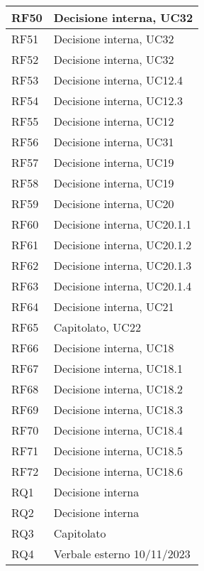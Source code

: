 \begin{center}
\begin{longtable}{|C{5cm}|C{5cm}|}
        \hline
        RF50 & Decisione interna, UC32 \\
        \hline
        RF51 & Decisione interna, UC32 \\
        \hline
        RF52 & Decisione interna, UC32 \\
        \hline
        RF53 & Decisione interna, UC12.4 \\
        \hline
        RF54 & Decisione interna, UC12.3 \\
        \hline
        RF55 & Decisione interna, UC12 \\
        \hline
        RF56 & Decisione interna, UC31 \\
        \hline
        RF57 & Decisione interna, UC19 \\
        \hline
        RF58 & Decisione interna, UC19 \\
        \hline
        RF59 & Decisione interna, UC20 \\
        \hline
        RF60 & Decisione interna, UC20.1.1 \\
        \hline
        RF61 & Decisione interna, UC20.1.2 \\
        \hline
        RF62 & Decisione interna, UC20.1.3 \\
        \hline
        RF63 & Decisione interna, UC20.1.4 \\
        \hline
        RF64 & Decisione interna, UC21 \\
        \hline
        RF65 & Capitolato, UC22 \\
        \hline
        RF66 & Decisione interna, UC18 \\
        \hline
        RF67 & Decisione interna, UC18.1 \\
        \hline
        RF68 & Decisione interna, UC18.2 \\
        \hline
        RF69 & Decisione interna, UC18.3 \\
        \hline
        RF70 & Decisione interna, UC18.4 \\
        \hline
        RF71 & Decisione interna, UC18.5 \\
        \hline
        RF72 & Decisione interna, UC18.6 \\
        \hline
        \hline
        RQ1 & Decisione interna \\
        \hline
        RQ2 & Decisione interna \\
        \hline
        RQ3 & Capitolato \\
        \hline
        RQ4 & Verbale esterno 10/11/2023 \\

\end{longtable}
\end{center}
